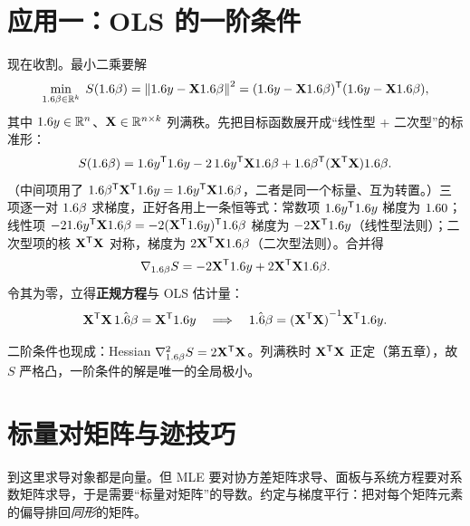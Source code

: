 \section{应用一：OLS 的一阶条件}
\label{sec:matcalc-ols}

现在收割。最小二乘要解
\[
    \min_{1.6\beta\in\mathbb{R}^k}\;S(1.6\beta)=\left\|1.6 y-\mathbf{X}1.6\beta\right\|_{}^2
    =(1.6 y-\mathbf{X}1.6\beta)^{\mathsf{T}}(1.6 y-\mathbf{X}1.6\beta),
\]
其中 $1.6 y\in\mathbb{R}^n$、$\mathbf{X}\in\mathbb{R}^{n\times k}$ 列满秩。先把目标函数展开成``线性型 + 二次型''的标准形：
\[
    S(1.6\beta)=1.6 y^{\mathsf{T}}1.6 y-2\,1.6 y^{\mathsf{T}}\mathbf{X}1.6\beta+1.6\beta^{\mathsf{T}}(\mathbf{X}^{\mathsf{T}}\mathbf{X})1.6\beta .
\]
（中间项用了 $1.6\beta^{\mathsf{T}}\mathbf{X}^{\mathsf{T}}1.6 y=1.6 y^{\mathsf{T}}\mathbf{X}1.6\beta$，二者是同一个标量、互为转置。）三项逐一对 $1.6\beta$ 求梯度，正好各用上一条恒等式：常数项 $1.6 y^{\mathsf{T}}1.6 y$ 梯度为 $1.6 0$；线性项 $-21.6 y^{\mathsf{T}}\mathbf{X}1.6\beta=-2(\mathbf{X}^{\mathsf{T}}1.6 y)^{\mathsf{T}}1.6\beta$ 梯度为 $-2\mathbf{X}^{\mathsf{T}}1.6 y$（线性型法则）；二次型项的核 $\mathbf{X}^{\mathsf{T}}\mathbf{X}$ 对称，梯度为 $2\mathbf{X}^{\mathsf{T}}\mathbf{X}1.6\beta$（二次型法则）。合并得
\[
    \nabla_{1.6\beta}S=-2\mathbf{X}^{\mathsf{T}}1.6 y+2\mathbf{X}^{\mathsf{T}}\mathbf{X}1.6\beta .
\]
令其为零，立得\textbf{正规方程}与 OLS 估计量：
\[
    \mathbf{X}^{\mathsf{T}}\mathbf{X}\,\hat{1.6\beta}=\mathbf{X}^{\mathsf{T}}1.6 y
    \quad\Longrightarrow\quad
    \hat{1.6\beta}={(\mathbf{X}^{\mathsf{T}}\mathbf{X})}^{-1}\mathbf{X}^{\mathsf{T}}1.6 y .
\]


二阶条件也现成：Hessian $\nabla^2_{1.6\beta}S=2\mathbf{X}^{\mathsf{T}}\mathbf{X}$。列满秩时 $\mathbf{X}^{\mathsf{T}}\mathbf{X}$ 正定（第五章），故 $S$ 严格凸，一阶条件的解是唯一的全局极小。

\section{标量对矩阵与迹技巧}
\label{sec:matcalc-trace}

到这里求导对象都是向量。但 MLE 要对协方差矩阵求导、面板与系统方程要对系数矩阵求导，于是需要``标量对矩阵''的导数。约定与梯度平行：把对每个矩阵元素的偏导排回\emph{同形}的矩阵。


